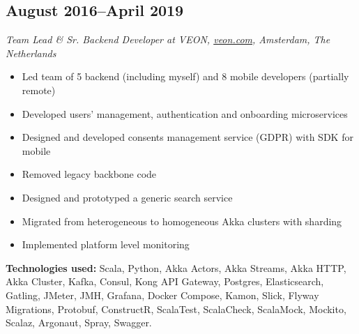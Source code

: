 \subsection*{August 2016--April 2019}

\textit{Team Lead \& Sr. Backend Developer at VEON,
\href{https://veon.com}{\url{veon.com}}, Amsterdam, The Netherlands}

\begin{itemize}[noitemsep]
  \item Led team of 5 backend (including myself) and 8 mobile developers (partially remote)
  \item Developed users' management, authentication and onboarding microservices
  \item Designed and developed consents management service (GDPR) with SDK for mobile
  \item Removed legacy backbone code
  \item Designed and prototyped a generic search service
  \item Migrated from heterogeneous to homogeneous Akka clusters with sharding
  \item Implemented platform level monitoring
\end{itemize}

\textbf{Technologies used:}
Scala, Python, Akka Actors, Akka Streams, Akka HTTP, Akka Cluster, Kafka, Consul, Kong API
Gateway, Postgres, Elasticsearch, Gatling, JMeter, JMH, Grafana, Docker Compose, Kamon, Slick,
Flyway Migrations, Protobuf, ConstructR, ScalaTest, ScalaCheck, ScalaMock, Mockito, Scalaz,
Argonaut, Spray, Swagger.
